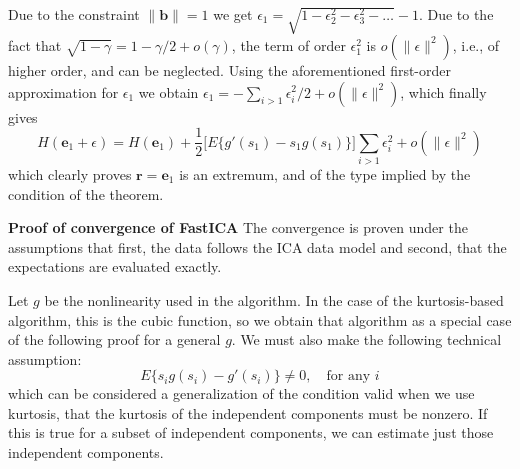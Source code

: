 \documentclass[12pt,a4paper,twoside,openany]{book}
\begin{document}
Due to the constraint $\|\mathbf{b}\| = 1$ we get $\epsilon_1 = \sqrt{1 - \epsilon_2^2 - \epsilon_3^2 - \dots} - 1$. 
Due to the fact that $\sqrt{1 - \gamma} = 1 - \gamma/2 + o(\gamma)$, the term of order $\epsilon_1^2$ is $o(\|\epsilon\|^2)$, i.e., of higher order, 
and can be neglected. Using the aforementioned first-order approximation for $\epsilon_1$ we obtain $\epsilon_1 = - \sum_{i>1} \epsilon_i^2 / 2 + o(\|\epsilon\|^2)$, which finally gives
\begin{equation}
    H(\mathbf{e}_1 + \epsilon) = H(\mathbf{e}_1) + \frac{1}{2} \Big[ E\{g'(s_1) - s_1 g(s_1)\} \Big] \sum_{i>1} \epsilon_i^2 + o(\|\epsilon\|^2)
\end{equation}
which clearly proves $\mathbf{r} = \mathbf{e}_1$ is an extremum, and of the type implied by the condition of the theorem.

\vspace{1em}
\noindent\textbf{Proof of convergence of FastICA} \cite[Chapter 8]{hyvarinen2001} The convergence is proven under the assumptions that first, 
the data follows the ICA data model and second, that the expectations are evaluated exactly.

Let $g$ be the nonlinearity used in the algorithm. In the case of the kurtosis-based algorithm, this is the cubic function, 
so we obtain that algorithm as a special case of the following proof for a general $g$. We must also make the following technical assumption:
\begin{equation}
    E\{s_i g(s_i) - g'(s_i)\} \neq 0, \quad \text{for any } i
\end{equation}
which can be considered a generalization of the condition valid when we use kurtosis, that the kurtosis of the independent components must be nonzero. 
If this is true for a subset of independent components, we can estimate just those independent components.
\end{document}
